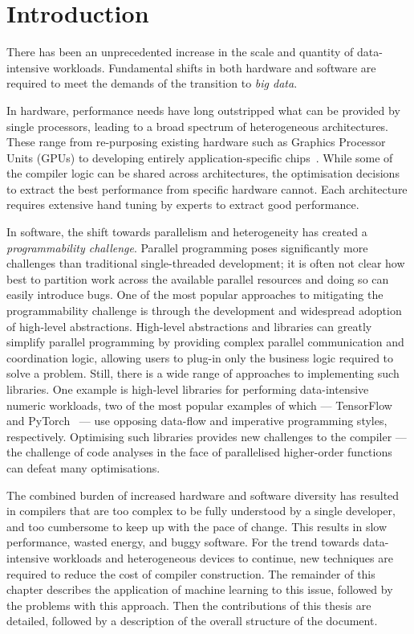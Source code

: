 \chapter{Introduction}

There has been an unprecedented increase in the scale and quantity of data-intensive workloads. Fundamental shifts in both hardware and software are required to meet the demands of the transition to \emph{big data}.

In hardware, performance needs have long outstripped what can be provided by single processors, leading to a broad spectrum of heterogeneous architectures. These range from re-purposing existing hardware such as Graphics Processor Units (GPUs) to developing entirely application-specific chips~\cite{Misra2010,Jouppi2017}. While some of the compiler logic can be shared across architectures, the optimisation decisions to extract the best performance from specific hardware cannot. Each architecture requires extensive hand tuning by experts to extract good performance.

In software, the shift towards parallelism and heterogeneity has created a \emph{programmability challenge}. Parallel programming poses significantly more challenges than traditional single-threaded development; it is often not clear how best to partition work across the available parallel resources and doing so can easily introduce bugs. One of the most popular approaches to mitigating the programmability challenge is through the development and widespread adoption of high-level abstractions. High-level abstractions and libraries can greatly simplify parallel programming by providing complex parallel communication and coordination logic, allowing users to plug-in only the business logic required to solve a problem. Still, there is a wide range of approaches to implementing such libraries. One example is high-level libraries for performing data-intensive numeric workloads, two of the most popular examples of which --- TensorFlow~\cite{Abadi} and PyTorch~\cite{Paszke2017} --- use opposing data-flow and imperative programming styles, respectively. Optimising such libraries provides new challenges to the compiler --- the challenge of code analyses in the face of parallelised higher-order functions can defeat many optimisations.

The combined burden of increased hardware and software diversity has resulted in compilers that are too complex to be fully understood by a single developer, and too cumbersome to keep up with the pace of change. This results in slow performance, wasted energy, and buggy software. For the trend towards data-intensive workloads and heterogeneous devices to continue, new techniques are required to reduce the cost of compiler construction. The remainder of this chapter describes the application of machine learning to this issue, followed by the problems with this approach. Then the contributions of this thesis are detailed, followed by a description of the overall structure of the document.


